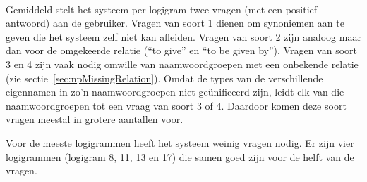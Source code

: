 \paragraph{} Gemiddeld stelt het systeem per logigram twee vragen (met een positief antwoord) aan de gebruiker. Vragen van soort 1 dienen om synoniemen aan te geven die het systeem zelf niet kan afleiden. Vragen van soort 2 zijn analoog maar dan voor de omgekeerde relatie (``to give'' en ``to be given by''). Vragen van soort 3 en 4 zijn vaak nodig omwille van naamwoordgroepen met een onbekende relatie (zie sectie~\ref{sec:npMissingRelation}). Omdat de types van de verschillende eigennamen in zo'n naamwoordgroepen niet geünificeerd zijn, leidt elk van die naamwoordgroepen tot een vraag van soort 3 of 4. Daardoor komen deze soort vragen meestal in grotere aantallen voor.

Voor de meeste logigrammen heeft het systeem weinig vragen nodig. Er zijn vier logigrammen (logigram 8, 11, 13 en 17) die samen goed zijn voor de helft van de vragen. 

